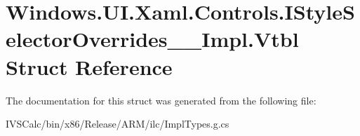 \hypertarget{struct_windows_1_1_u_i_1_1_xaml_1_1_controls_1_1_i_style_selector_overrides_____impl_1_1_vtbl}{}\section{Windows.\+U\+I.\+Xaml.\+Controls.\+I\+Style\+Selector\+Overrides\+\_\+\+\_\+\+Impl.\+Vtbl Struct Reference}
\label{struct_windows_1_1_u_i_1_1_xaml_1_1_controls_1_1_i_style_selector_overrides_____impl_1_1_vtbl}


The documentation for this struct was generated from the following file\+:\begin{DoxyCompactItemize}
\item 
I\+V\+S\+Calc/bin/x86/\+Release/\+A\+R\+M/ilc/Impl\+Types.\+g.\+cs\end{DoxyCompactItemize}
